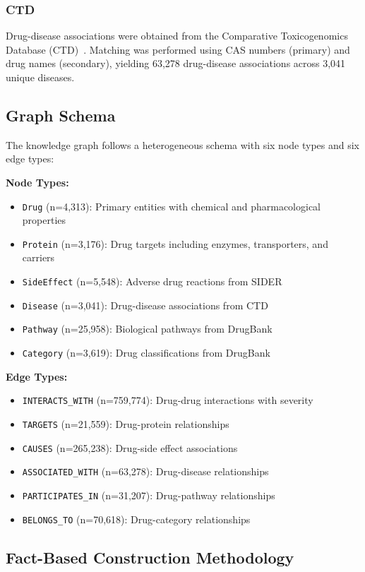 \documentclass[11pt]{article}
\begin{document}
\subsubsection{CTD}
Drug-disease associations were obtained from the Comparative Toxicogenomics Database (CTD)~\cite{davis2021ctd}. Matching was performed using CAS numbers (primary) and drug names (secondary), yielding 63,278 drug-disease associations across 3,041 unique diseases.

\subsection{Graph Schema}

The knowledge graph follows a heterogeneous schema with six node types and six edge types:

\textbf{Node Types:}
\begin{itemize}
    \item \texttt{Drug} (n=4,313): Primary entities with chemical and pharmacological properties
    \item \texttt{Protein} (n=3,176): Drug targets including enzymes, transporters, and carriers
    \item \texttt{SideEffect} (n=5,548): Adverse drug reactions from SIDER
    \item \texttt{Disease} (n=3,041): Drug-disease associations from CTD
    \item \texttt{Pathway} (n=25,958): Biological pathways from DrugBank
    \item \texttt{Category} (n=3,619): Drug classifications from DrugBank
\end{itemize}

\textbf{Edge Types:}
\begin{itemize}
    \item \texttt{INTERACTS\_WITH} (n=759,774): Drug-drug interactions with severity
    \item \texttt{TARGETS} (n=21,559): Drug-protein relationships
    \item \texttt{CAUSES} (n=265,238): Drug-side effect associations
    \item \texttt{ASSOCIATED\_WITH} (n=63,278): Drug-disease relationships
    \item \texttt{PARTICIPATES\_IN} (n=31,207): Drug-pathway relationships
    \item \texttt{BELONGS\_TO} (n=70,618): Drug-category relationships
\end{itemize}

\subsection{Fact-Based Construction Methodology}
\end{document}
